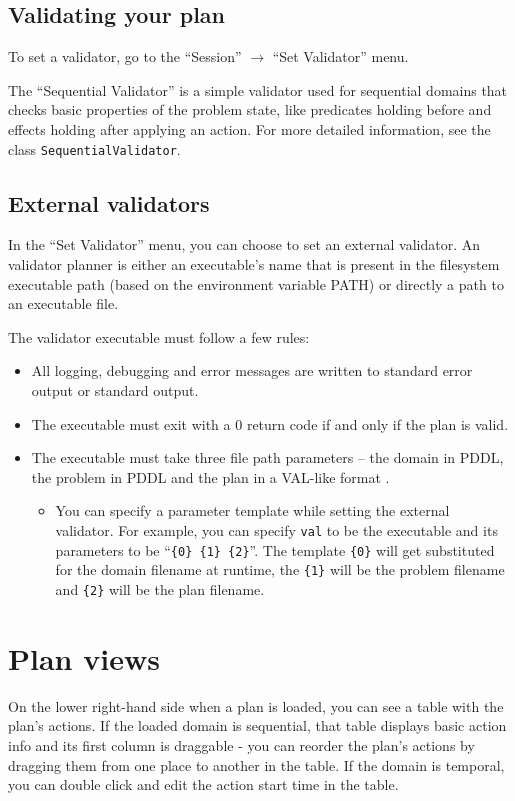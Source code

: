 \documentclass[12pt,a4paper,twoside]{article}
\begin{document}
\subsection{Validating your plan}
To set a validator, go to the ``Session'' $\to$ ``Set Validator'' menu.

The ``Sequential Validator'' is a simple validator used for sequential domains that checks basic
properties of the problem state, like predicates holding before and effects holding after applying an action.
For more detailed information, see the class \texttt{SequentialValidator}.

\subsection{External validators}
In the ``Set Validator'' menu, you can choose to set an external validator. An validator planner is either an
executable's name that is present in the filesystem executable path (based on the environment variable PATH)
or directly a path to an executable file.

The validator executable must follow a few rules:

\begin{itemize}
\item All logging, debugging and error messages are written to standard error output or standard output.

\item The executable must exit with a 0 return code if and only if the plan is valid.

\item The executable must take three file path parameters -- the domain in PDDL, the problem in PDDL and the plan in a
VAL-like format \citep[Figure~2]{Howey2003}.

\begin{itemize}

\item You can specify a parameter template while setting the external validator.
For example, you can specify \texttt{val} to be the executable and its parameters to be ``\verb+{0} {1} {2}+''.
The template \verb+{0}+ will get substituted for the domain filename at runtime, the \verb+{1}+ will be the problem filename and
\verb+{2}+ will be the plan filename.

\end{itemize}

\end{itemize}

\section{Plan views}
On the lower right-hand side when a plan is loaded, you can see a table with the plan's actions. If the loaded domain
is sequential, that table displays basic action info and its first column is draggable - you can reorder the plan's
actions by dragging them from one place to another in the table. If the domain is temporal, you can double click and
edit the action start time in the table.
\end{document}
